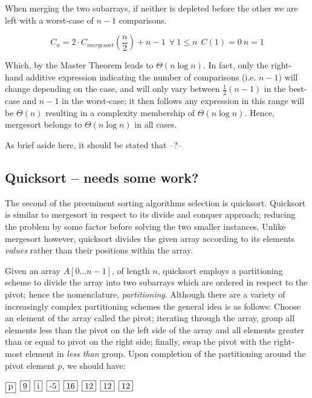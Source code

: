 \documentclass[11pt,letterpaper]{report}
\begin{document}
When merging the two subarrays, if neither is depleted before the other we are left with a worst-case of $n-1$ comparisons. 

\begin{equation} 
C_n=2 \cdot C_{mergesort}(\frac{n}{2})+n-1 \ \ \forall \ 1 \leq n \ \ C(1) = 0 \ n=1
\end{equation}

Which, by the Master Theorem leads to $\Theta(n\log{}n)$. In fact, only the right-hand additive expression indicating the number of comparisons (i.e. $n-1$) will change depending on the case, and will only vary between $\frac{1}{2}(n-1)$ in the best-case and $n-1$ in the worst-case; it then follows any expression in this range will be $\Theta(n)$ resulting in a complexity membership of $\Theta(n\log{}n)$. Hence, mergesort belongs to $\Theta(n\log{}n)$ in all cases.

As brief aside here, it should be stated that --?--

\subsection*{Quicksort -- needs some work?}			%
The second of the preeminent sorting algorithms selection is quicksort. Quicksort is similar to mergesort in respect to its divide and conquer approach; reducing the problem by some factor before solving the two smaller instances. Unlike mergesort however, quicksort divides the given array according to its elements \emph{values} rather than their positions within the array.

Given an array $A[0...n-1]$, of length $n$, quicksort employs a partitioning scheme to divide the array into two subarrays which are ordered in respect to the pivot; hence the nomenclature, \emph{partitioning}. Although there are a variety of increasingly complex partitioning schemes the general idea is as follows:
Choose an element of the array called the pivot; iterating through the array, group all elements less than the pivot on the left side of the array and all elements greater than or equal to pivot on the right side; finally, swap the pivot with the right-most element in \emph{less than} group. Upon completion of the partitioning around the pivot element $p$, we should have:

  \newcommand{\sep}{\hspace*{.5em}}
  \noindent
  $\fbox{p} \sep \fbox{9} \sep \fbox{i} \sep \fbox{-5} \sep \fbox{16} \sep \fbox{12} \sep \fbox{12} \sep \fbox{12}$
  
\end{document}
